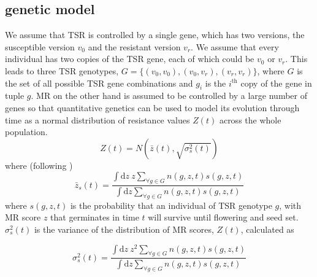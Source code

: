 \documentclass[12pt, a4paper]{article}
\begin{document}
\subsection{genetic model}
We assume that TSR is controlled by a single gene, which has two versions, the susceptible version $v_0$ and the resistant version $v_r$. We assume that every individual has two copies of the TSR gene, each of which could be $v_0$ or $v_r$. This leads to three TSR genotypes, $G = \{(v_0, v_0), (v_0, v_r), (v_r, v_r)\}$, where $G$ is the set of all possible TSR gene combinations and $g_i$ is the $i^\text{th}$ copy of the gene in tuple $g$. MR on the other hand is assumed to be controlled by a large number of genes so that quantitative genetics can be used to model its evolution through time as a normal distribution of resistance values $Z(t)$ across the whole population. 
\begin{equation}\label{eq:MR_dist}
	Z(t) = N(\bar{z}(t),\sqrt{\sigma_s^2(t)})
\end{equation}
where (following \cite{Coul2010})
\begin{equation}\label{eq:MR_mean}
	\bar{z}_s(t) = \frac{\int \text{d}z~z\displaystyle\sum_{\forall g \in G}n(g, z, t)s(g, z, t)}{\int \text{d}z\displaystyle\sum_{\forall g \in G}n(g, z, t)s(g, z, t)}
\end{equation}
where $s(g, z, t)$ is the probability that an individual of TSR genotype $g$, with MR score $z$ that germinates in time $t$ will survive until flowering and seed set. $\sigma_s^2(t)$ is the variance of the distribution of MR scores, $Z(t)$, calculated as 
    
\begin{equation}\label{eq:MR_sd}
	\sigma_s^2(t) = \frac{\int \text{d}z~z^2\displaystyle\sum_{\forall g \in G}n(g, z, t)s(g, z, t)}{\int \text{d}z\displaystyle\sum_{\forall g \in G}n(g, z, t)s(g, z, t)}
\end{equation}
\end{document}
